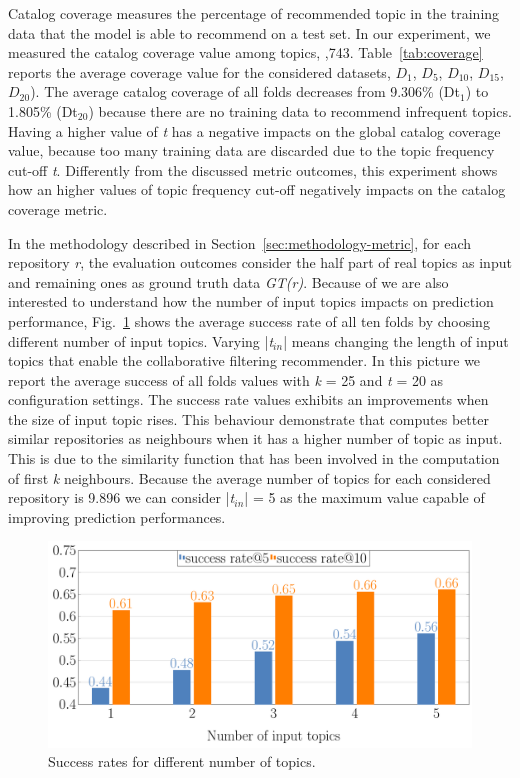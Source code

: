 

Catalog coverage measures the percentage of recommended topic in the training data that the model is able to recommend on a test set. In our experiment, we measured the catalog coverage value among topics, ,743. Table~\ref{tab:coverage} reports the average coverage value for the considered datasets, \ie $D_{1}$, $D_{5}$, $D_{10}$, $D_{15}$, $D_{20}$). %
The average catalog coverage of all folds decreases from 9.306\% (Dt$_1$) to 1.805\% (Dt$_{20}$) because there are no training data to recommend infrequent topics. 
Having a higher value of \emph{t} has a negative impacts on the global catalog coverage value, because too many training data are discarded due to the topic frequency cut-off \emph{t}. Differently from the discussed metric outcomes, this experiment shows how an higher values of topic frequency cut-off negatively impacts on the catalog coverage metric.

In the methodology described in Section~\ref{sec:methodology-metric}, for each repository \emph{r}, the evaluation outcomes consider the half part of real topics as input and remaining ones as ground truth data \emph{GT(r)}. Because of we are also interested to understand how the number of input topics impacts on prediction performance, Fig.~\ref{fig:pr-input-topics} shows the average success rate of all ten folds by choosing different number of input topics. Varying |\emph{t$_{in}$}| means changing the length of input topics that enable the \TF collaborative filtering recommender. In this picture we report the average success of all folds values with \emph{k} = 25 and \emph{t} = 20 as configuration settings. The success rate values exhibits an improvements when the size of input topic rises. This  behaviour demonstrate that \TF computes better similar repositories as neighbours when it has a higher number of topic as input. This is due to the similarity function that has been involved in the computation of first  \emph{k} neighbours. Because the average number of topics for each considered repository is 9.896 we can consider |\emph{t$_{in}$}| = 5 as the maximum value capable of improving prediction performances.
\begin{figure}[t!]
	\centering
	\includegraphics[width=0.8\linewidth]{figs/successRate_inputTopic.pdf}
	\caption{Success rates for different number of topics.}
	\label{fig:pr-input-topics}
\end{figure} 

